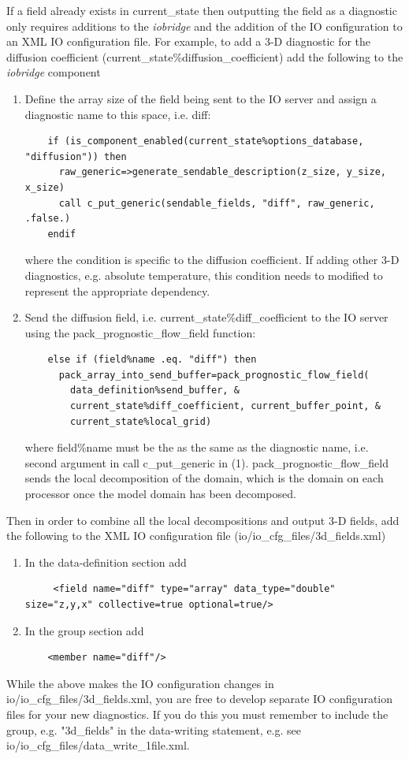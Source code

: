 \documentclass[a4paper,11pt]{article}
\begin{document}
If a field already exists in current\_state then outputting the field as a
diagnostic only requires additions to the \emph{iobridge} and the addition of
the IO configuration to an XML IO configuration file. For example, to add a
3-D diagnostic for the diffusion coefficient (current\_state\%diffusion\_coefficient)
add the following to the \emph{iobridge} component
\begin{enumerate}
  \item {Define the array size of the field being sent
  to the IO server and assign a diagnostic name to this space, i.e. diff:
  \begin{lstlisting}
    if (is_component_enabled(current_state%options_database, "diffusion")) then
      raw_generic=>generate_sendable_description(z_size, y_size, x_size)
      call c_put_generic(sendable_fields, "diff", raw_generic, .false.)
    endif
  \end{lstlisting}
  where the condition is specific to the diffusion coefficient. If adding other
  3-D diagnostics, e.g. absolute temperature, this condition needs to modified
  to represent the appropriate dependency.
  }
  \item {Send the diffusion field, i.e.
  current\_state\%diff\_coefficient to the IO server using the
  pack\_prognostic\_flow\_field function:
  \begin{lstlisting}
    else if (field%name .eq. "diff") then
      pack_array_into_send_buffer=pack_prognostic_flow_field(
        data_definition%send_buffer, &
        current_state%diff_coefficient, current_buffer_point, &
        current_state%local_grid)
  \end{lstlisting}
  where field\%name must be the as the same as the diagnostic name, i.e. second
  argument in call c\_put\_generic in (1). pack\_prognostic\_flow\_field sends the
  local decomposition of the domain, which is the domain on each processor once
  the model domain has been decomposed.
  }
\end{enumerate}

Then in order to combine all the local decompositions and output 3-D fields,
add the following to the XML IO configuration file (io/io\_cfg\_files/3d\_fields.xml)
\begin{enumerate}
  \item {In the data-definition section add
  \begin{lstlisting}
     <field name="diff" type="array" data_type="double" size="z,y,x" collective=true optional=true/>
  \end{lstlisting}
  }
  \item {In the group section add
  \begin{lstlisting}
    <member name="diff"/>
  \end{lstlisting}
  }
\end{enumerate}
While the above makes the IO configuration changes in io/io\_cfg\_files/3d\_fields.xml,
you are free to develop separate IO configuration files for your new diagnostics.
If you do this you must remember to include the group, e.g. "3d\_fields" in the
data-writing statement, e.g. see io/io\_cfg\_files/data\_write\_1file.xml.
\end{document}

